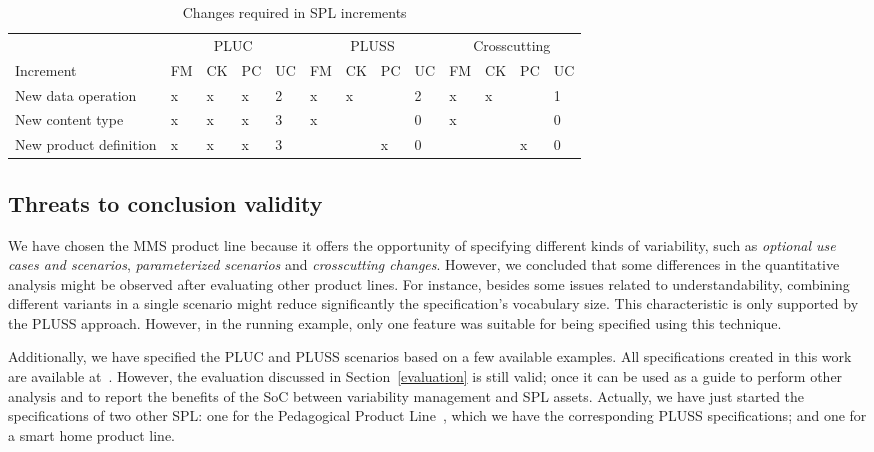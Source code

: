 \documentclass{acm_proc_article-sp}
\begin{document}
\begin{table*}[t]
\centering
\caption{Changes required in SPL increments}
\label{tab:incremental-results}
\begin{small}
\begin{tabular}{l|llll|llll|llll} \hline
& \multicolumn{4}{|c|}{PLUC} & \multicolumn{4}{|c|}{PLUSS}  & \multicolumn{4}{|c}{Crosscutting} \\
Increment 			& FM 	& CK   & PC & UC	& FM 	& CK & PC 	& UC 	& FM 	& CK & PC 	& UC  	\\ \hline
New data operation  	& x		& x	   & x    &	2	& x 		& x 	 & 		& 2		& x		& x	 & 		& 1		\\ 
New content type      	& x 		& x	   & x	    &	3	& x		&	 & 		& 0		& x		& 	 &		& 0		\\
New product definition 	& x 		& x	   & x	    &	3	& 		& 	 & x	 	& 0		& 		& 	 & x		& 0		\\ \hline
\end{tabular}
\end{small}
\end{table*}
  
\subsection{Threats to conclusion validity}
\label{threats}

We have chosen the MMS product line because it offers the opportunity of specifying different kinds 
of variability, such as \emph{optional use cases and scenarios}, \emph{parameterized scenarios} and 
\emph{crosscutting changes}. However, we concluded that some differences in the quantitative 
analysis might be observed after evaluating other product lines. For instance, besides some issues related 
to understandability, combining different variants in a single scenario might reduce significantly the  
specification's vocabulary size. This characteristic is only supported by the PLUSS approach. However, in 
the running example, only one feature was suitable for being specified using this technique.  


Additionally, we have specified the PLUC and PLUSS scenarios based on a few available examples. All specifications created in this work are available at~\cite{}. However, the evaluation discussed in Section~\ref{evaluation} is
still valid; once it can be used as a guide to perform other analysis and to report the benefits of the SoC between variability management and SPL assets. Actually, we have just started the specifications of two other SPL: one for the Pedagogical Product Line~\cite{}, which we have the corresponding PLUSS specifications; and one for a smart home product line.
\end{document}
